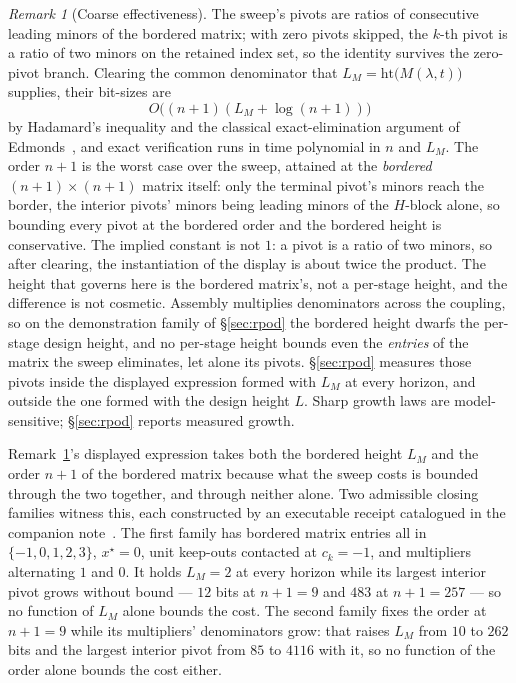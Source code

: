 \documentclass[11pt]{article}
\theoremstyle{definition}
\theoremstyle{remark}
\newtheorem{remark}{Remark}
\renewcommand{\_}{\ifdim\fontdimen3\font=0pt\relax\char`\_\else\textunderscore\fi\hspace{0pt}}
\begin{document}
\begin{remark}[Coarse effectiveness]\label{rem:effective}
The sweep's pivots are ratios of consecutive leading minors of the bordered
matrix; with zero pivots skipped, the $k$-th pivot is a ratio of two minors
on the retained index set, so the identity survives the zero-pivot branch.
Clearing the common denominator that
$L_M=\mathrm{ht}\bigl(M(\lambda,t)\bigr)$ supplies, their bit-sizes are
\[
O\bigl((n{+}1)(L_M+\log(n{+}1))\bigr)
\]
by Hadamard's inequality and the classical exact-elimination argument of
Edmonds~\cite{edmonds1967}, and exact verification runs in time polynomial in
$n$ and $L_M$. The order $n{+}1$ is the worst case over the sweep, attained at
the \emph{bordered} $(n{+}1)\times(n{+}1)$ matrix itself: only the terminal
pivot's minors reach the border, the interior pivots' minors being leading
minors of the $H$-block alone, so bounding every pivot at the bordered order
and the bordered height is conservative. The implied constant is not $1$: a
pivot is a ratio of two minors, so after clearing, the instantiation of the
display is about twice the product. The height that governs here is the
bordered matrix's, not a per-stage height, and the difference is not
cosmetic. Assembly multiplies denominators across the coupling, so on the
demonstration family of \S\ref{sec:rpod} the bordered height dwarfs the
per-stage design height, and no per-stage height bounds even the
\emph{entries} of the matrix the sweep eliminates, let alone its pivots.
\S\ref{sec:rpod} measures those pivots inside the displayed expression formed
with $L_M$ at every horizon, and outside the one formed with the design
height $L$. Sharp growth laws are model-sensitive; \S\ref{sec:rpod} reports
measured growth.
\end{remark}

\noindent Remark~\ref{rem:effective}'s displayed expression takes both the
bordered height $L_M$ and the order $n{+}1$ of the bordered matrix because
what the sweep costs is bounded through the two together, and through neither
alone. Two admissible closing families witness this, each constructed by an
executable receipt catalogued in the companion note~\cite{leannote}. The
first family has bordered matrix entries all in $\{-1,0,1,2,3\}$,
$x^\star=0$, unit keep-outs contacted at $c_k=-1$, and multipliers
alternating $1$ and $0$. It holds $L_M=2$ at every horizon while its largest
interior pivot grows without bound --- $12$ bits at $n{+}1=9$ and $483$ at
$n{+}1=257$ --- so no function of $L_M$ alone bounds the cost. The second
family fixes the order at $n{+}1=9$ while its multipliers' denominators
grow: that raises $L_M$ from $10$ to $262$ bits and the largest interior
pivot from $85$ to $4116$ with it, so no function of the order alone bounds
the cost either.
\end{document}
